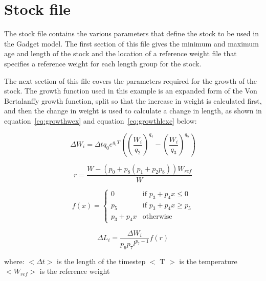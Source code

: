 \documentclass[10pt,titlepage]{article}
\begin{document}
{\small }
{\small }
{\small }
{\small }
{\small }
{\small }
{\small }
{\small }

\section{Stock file}
The stock file contains the various parameters that define the stock to be used in the Gadget model.  The first section of this file gives the minimum and maximum age and length of the stock and the location of a reference weight file that specifies a reference weight for each length group for the stock.

\bigskip
The next section of this file covers the parameters required for the growth of the stock.  The growth function used in this example is an expanded form of the Von Bertalanffy growth function, split so that the increase in weight is calculated first, and then the change in weight is used to calculate a change in length, as shown in equation~\ref{eq:growthwex} and equation~\ref{eq:growthlexc} below:

\begin{equation}\label{eq:growthwex}
\Delta W_i = \Delta t q_0 e^{q_1T}\left(\left( \frac{W_i}{q_2} \right)^{q_4} - \left( \frac{W_i}{q_3} \right)^{q_5} \right)
\end{equation}

\begin{equation}\label{eq:growthlexa}
 r = \frac{W - \left( p_{0} + p_{8} \left( p_{1} + p_{2}p_{8} \right) \right) W_{ref}}{W}
\end{equation}

\begin{equation}\label{eq:growthlexb}
f(x) =
\begin{cases}
  0
  & \textrm{if $p_{3} + p_{4}x \leq 0$} \\
  p_{5}
  & \textrm{if $p_{3} + p_{4}x \geq p_{5}$} \\
  p_{3} + p_{4}x
  & \textrm{otherwise}
\end{cases}
\end{equation}

\begin{equation}\label{eq:growthlexc}
\Delta L_i = \frac{\Delta W_i} {p_{6} p_{7} l^{p_{7} - 1}} f(r)
\end{equation}

where:\newline
$<\Delta t>$ is the length of the timestep\newline
$<$ T $>$ is the temperature\newline
$<W_{ref}>$ is the reference weight
\end{document}
